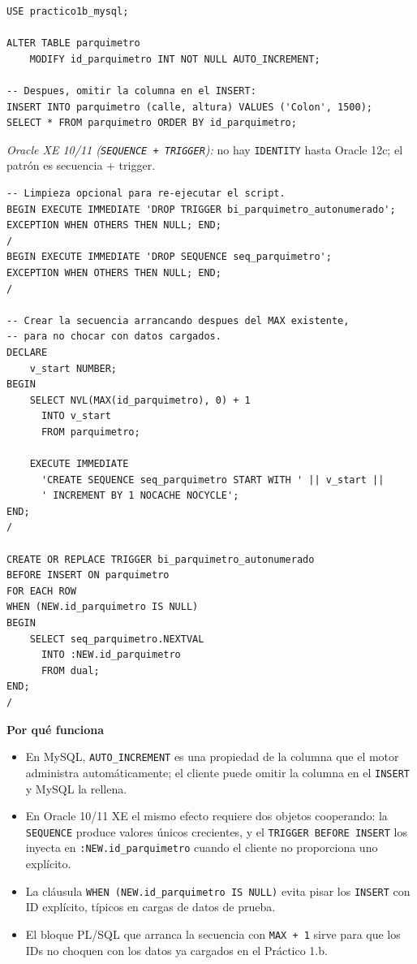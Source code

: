 \documentclass[11pt,a4paper]{article}
\newcommand{\itemcabecera}[1]{\noindent\textbf{#1}\par\medskip}
\newcommand{\bloquePorque}{\itemcabecera{Por qu\'e funciona}}
\begin{document}
\begin{lstlisting}
USE practico1b_mysql;

ALTER TABLE parquimetro
    MODIFY id_parquimetro INT NOT NULL AUTO_INCREMENT;

-- Despues, omitir la columna en el INSERT:
INSERT INTO parquimetro (calle, altura) VALUES ('Colon', 1500);
SELECT * FROM parquimetro ORDER BY id_parquimetro;
\end{lstlisting}

\textit{Oracle XE 10/11 (\texttt{SEQUENCE + TRIGGER}):} no hay \texttt{IDENTITY} hasta Oracle 12c; el patrón es secuencia + trigger.

\begin{lstlisting}
-- Limpieza opcional para re-ejecutar el script.
BEGIN EXECUTE IMMEDIATE 'DROP TRIGGER bi_parquimetro_autonumerado';
EXCEPTION WHEN OTHERS THEN NULL; END;
/
BEGIN EXECUTE IMMEDIATE 'DROP SEQUENCE seq_parquimetro';
EXCEPTION WHEN OTHERS THEN NULL; END;
/

-- Crear la secuencia arrancando despues del MAX existente,
-- para no chocar con datos cargados.
DECLARE
    v_start NUMBER;
BEGIN
    SELECT NVL(MAX(id_parquimetro), 0) + 1
      INTO v_start
      FROM parquimetro;

    EXECUTE IMMEDIATE
      'CREATE SEQUENCE seq_parquimetro START WITH ' || v_start ||
      ' INCREMENT BY 1 NOCACHE NOCYCLE';
END;
/

CREATE OR REPLACE TRIGGER bi_parquimetro_autonumerado
BEFORE INSERT ON parquimetro
FOR EACH ROW
WHEN (NEW.id_parquimetro IS NULL)
BEGIN
    SELECT seq_parquimetro.NEXTVAL
      INTO :NEW.id_parquimetro
      FROM dual;
END;
/
\end{lstlisting}

\bloquePorque

\begin{itemize}
    \item En MySQL, \texttt{AUTO\_INCREMENT} es una propiedad de la columna que el motor administra automáticamente; el cliente puede omitir la columna en el \texttt{INSERT} y MySQL la rellena.
    \item En Oracle 10/11 XE el mismo efecto requiere dos objetos cooperando: la \texttt{SEQUENCE} produce valores únicos crecientes, y el \texttt{TRIGGER BEFORE INSERT} los inyecta en \texttt{:NEW.id\_parquimetro} cuando el cliente no proporciona uno explícito.
    \item La cláusula \texttt{WHEN (NEW.id\_parquimetro IS NULL)} evita pisar los \texttt{INSERT} con ID explícito, típicos en cargas de datos de prueba.
    \item El bloque PL/SQL que arranca la secuencia con \texttt{MAX + 1} sirve para que los IDs no choquen con los datos ya cargados en el Práctico 1.b.
\end{itemize}
\end{document}
